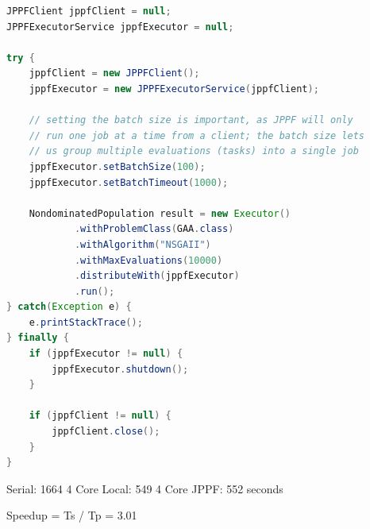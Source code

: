 \begin{lstlisting}[language=Java]
JPPFClient jppfClient = null;
JPPFExecutorService jppfExecutor = null;

try {
	jppfClient = new JPPFClient();
	jppfExecutor = new JPPFExecutorService(jppfClient);
		
	// setting the batch size is important, as JPPF will only
	// run one job at a time from a client; the batch size lets
	// us group multiple evaluations (tasks) into a single job
	jppfExecutor.setBatchSize(100);
	jppfExecutor.setBatchTimeout(1000);
	
	NondominatedPopulation result = new Executor()
			.withProblemClass(GAA.class)
			.withAlgorithm("NSGAII")
			.withMaxEvaluations(10000)
			.distributeWith(jppfExecutor)
			.run();
} catch(Exception e) {
	e.printStackTrace();
} finally {
	if (jppfExecutor != null) {
		jppfExecutor.shutdown();
	}
		
	if (jppfClient != null) {
		jppfClient.close();
	}
}
\end{lstlisting}


Serial: 1664
4 Core Local: 549
4 Core JPPF: 552 seconds


Speedup = Ts / Tp
        = 3.01